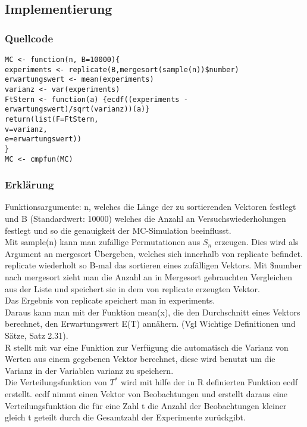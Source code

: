 \documentclass[a4paper, 10pt]{article}
\begin{document}
\subsection{Implementierung}
\subsubsection{Quellcode}
\begin{lstlisting}
MC <- function(n, B=10000){
experiments <- replicate(B,mergesort(sample(n))$number)
erwartungswert <- mean(experiments)
varianz <- var(experiments)
FtStern <- function(a) {ecdf((experiments - erwartungswert)/sqrt(varianz))(a)}
return(list(F=FtStern, 
v=varianz, 
e=erwartungswert))
}
MC <- cmpfun(MC)
\end{lstlisting}
\subsubsection{Erklärung}
Funktionsargumente: n, welches die Länge der zu sortierenden Vektoren festlegt und B (Standardwert: 10000) welches die Anzahl an Versuchswiederholungen festlegt und so die genauigkeit der MC-Simulation beeinflusst. \\
Mit sample(n) kann man zufällige Permutationen aus $S_n$ erzeugen. Dies wird als Argument an mergesort Übergeben, welches sich innerhalb von replicate befindet. \\
replicate wiederholt so B-mal das sortieren eines zufälligen Vektors. Mit \$number nach mergesort zieht man die Anzahl an in Mergesort gebrauchten Vergleichen aus der Liste und speichert sie in dem von replicate erzeugten Vektor.\\
Das Ergebnis von replicate speichert man in experiments.\\
Daraus kann man mit der Funktion mean(x), die den Durchschnitt eines Vektors berechnet, den Erwartungswert E(T) annähern. (Vgl Wichtige Definitionen und Sätze, Satz 2.31). \\
R stellt mit var eine Funktion zur Verfügung die automatisch die Varianz von Werten aus einem gegebenen Vektor berechnet, diese wird benutzt um die Varianz in der Variablen varianz zu speichern.\\
Die Verteilungsfunktion von $T^*$ wird mit hilfe der in R definierten Funktion ecdf erstellt. ecdf nimmt einen Vektor von Beobachtungen und erstellt daraus eine Verteilungsfunktion die für eine Zahl t die Anzahl der Beobachtungen kleiner gleich t geteilt durch die Gesamtzahl der Experimente zurückgibt.
\end{document}
